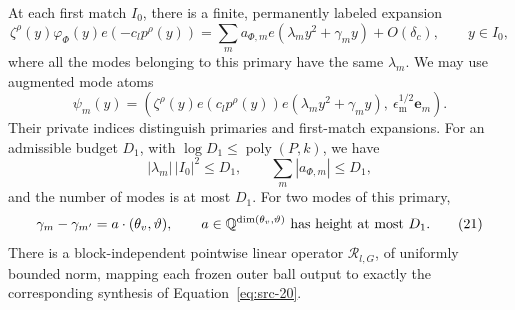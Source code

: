 \begin{lemma}
\label{lem:first-match-lift}
At each first match \(I_0\), there is a finite, permanently labeled
expansion
\[
 \zeta^\rho(y)\varphi_\Phi(y)e(-c_l p^\rho(y))
 =\sum_m a_{\Phi,m}e(\lambda_m y^2+\gamma_m y)
       +O(\delta_c),\qquad y\in I_0,
\]
where all the modes belonging to this primary have the same
\(\lambda_m\).  We may use augmented mode atoms
\begin{equation*}
 \psi_m(y)=
 \left(
 \zeta^\rho(y)e(c_l p^\rho(y))
       e(\lambda_m y^2+\gamma_m y),
 \ \epsilon_{\mathrm m}^{1/2}\mathbf e_m
 \right).
 \tag{20}\label{eq:src-20}
\end{equation*}
Their private indices distinguish primaries and first-match
expansions.  For an admissible budget \(D_1\), with
\(\log D_1\le\operatorname{poly}(P,k)\), we have
\[
 |\lambda_m|\,|I_0|^2\le D_1,\qquad
 \sum_m|a_{\Phi,m}|\le D_1,
\]
and the number of modes is at most \(D_1\).  For two modes of this
primary,
\begin{equation*}
 \gamma_m-\gamma_{m'}=a\cdot(\theta_v,\vartheta),
 \qquad a\in\mathbb Q^{\dim(\theta_v,\vartheta)}
       \text{ has height at most }D_1 .
 \tag{21}\label{eq:src-21}
\end{equation*}
There is a block-independent pointwise linear operator
\(\mathscr R_{l,G}\), of uniformly bounded norm, mapping each frozen
outer ball output to exactly the corresponding synthesis of
Equation~\eqref{eq:src-20}.
\end{lemma}

